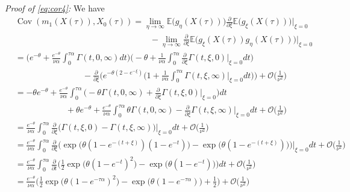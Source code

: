 \documentclass{imsart}
\theoremstyle{plain}
\theoremstyle{definition}
\begin{document}
\noindent\emph{Proof of \eqref{eq:cor4}:}
We have 
\begin{align*}
&\operatorname{Cov}(m_1(X(\tau)), X_0(\tau)) = \lim_{\eta \to\infty} \mathbb E\big(g_\eta(X(\tau))\big) \frac{\partial}{\partial\xi} \mathbb E\big(g_\xi(X(\tau))\big)\Big|_{\xi=0}\\ & \qquad \qquad \qquad \qquad \qquad \qquad \qquad \qquad  - \lim_{\eta \to\infty} \frac{\partial}{\partial\xi} \mathbb E\big(g_\xi(X(\tau))g_\eta(X(\tau))\big)\Big|_{\xi=0} \\ & = \Big( e^{-\theta} + \frac{e^{-\theta}}{\nu \alpha} \int_0^{\tau\alpha} \Gamma(t, 0, \infty) dt \Big) \Big(- \theta + \frac{1}{\nu \alpha} \int_0^{\tau\alpha} \frac{\partial}{\partial\xi} \Gamma(t,\xi, 0) \Big|_{\xi = 0} dt \Big) \\ & \qquad \qquad \qquad \qquad - \frac{\partial}{\partial\xi} \Big( e^{-\theta(2 - e^{-\xi})}\Big(1  + \frac{1}{\nu \alpha} \int_0^{\tau\alpha} \Gamma(t, \xi, \infty) \Big|_{\xi = 0} dt \Big) \Big) + \mathcal O\Big(\frac{1}{\nu^2}\Big)
\\ & = -\theta e^{-\theta} + \frac{e^{-\theta}}{\nu \alpha} \int_0^{\tau\alpha} \Big(- \theta \Gamma(t,0,\infty) + \frac{\partial}{\partial\xi} \Gamma(t,\xi,0) \Big|_{\xi = 0}\Big) dt \\ & \qquad \qquad \qquad + \theta e^{-\theta} + \frac{e^{-\theta}}{\nu \alpha} \int_0^{\tau\alpha} \theta \Gamma(t,0,\infty) - \frac{\partial}{\partial\xi} \Gamma(t,\xi,\infty)\Big|_{\xi = 0} dt + \mathcal O\Big(\frac{1}{\nu^2}\Big)
 \\ & 
= \frac{e^{-\theta}}{\nu \alpha} \int_0^{\tau\alpha} \frac{\partial}{\partial\xi}\Big( \Gamma(t,\xi,0) - \Gamma(t,\xi,\infty)\Big) \Big|_{\xi = 0} dt + \mathcal O\Big(\frac{1}{\nu^2}\Big)
\\ & = \frac{e^{-\theta}}{\nu \alpha} \int_0^{\tau\alpha} 
\frac{\partial}{\partial\xi} \Big( \exp\Big( \theta(1 \! - e^{-(t + \xi)})(1 \!- e^{-t}) \Big) - \exp\Big( \theta(1 - e^{-(t + \xi)}) \Big) \Big)\Big|_{\xi = 0} dt + \mathcal O\Big(\frac{1}{\nu^2}\Big)
\\ & = \frac{e^{-\theta}}{\nu \alpha} \int_0^{\tau\alpha} 
\frac{\partial}{\partial t} \Big( \tfrac 12 \exp\Big( \theta(1 - e^{-t})^2 \Big) - \exp\Big( \theta(1 - e^{-t}) \Big) \Big)dt + \mathcal O\Big(\frac{1}{\nu^2}\Big)
\\ & = \frac{e^{-\theta}}{\nu \alpha} \Big( \tfrac 12 \exp\Big( \theta(1 - e^{-\tau\alpha})^2 \Big) - \exp\Big( \theta(1 - e^{-\tau\alpha})\Big) + \tfrac 12\Big) + \mathcal O\Big(\frac{1}{\nu^2}\Big)
\end{align*}
\end{document}
